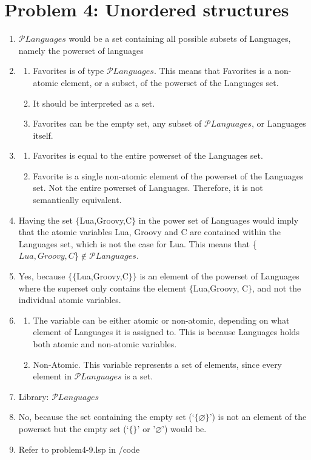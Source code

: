 \documentclass[12pt]{article}
\begin{document}
\section*{Problem 4: Unordered structures}
\begin{enumerate}
	\item $\mathcal{P}Languages$ would be a set containing all possible subsets of Languages, namely the powerset of languages
	\item 
	\begin{enumerate}
		\item Favorites is of type $\mathcal{P}Languages$. This means that Favorites is a non-atomic element, or a subset, of the powerset of the Languages set.
		\item It should be interpreted as a set.
		\item Favorites can be the empty set, any subset of $\mathcal{P}Languages$, or Languages itself.
	\end{enumerate}
	\item
	\begin{enumerate}
		\item Favorites is equal to the entire powerset of the Languages set.
		\item Favorite is a single non-atomic element of the powerset of the Languages set. Not the entire powerset of Languages. Therefore, it is not semantically equivalent.
	\end{enumerate}
	
	\item Having the set $\{$Lua,Groovy,C$\}$ in the power set of Languages would imply that the atomic variables Lua, Groovy and C are contained within the Languages set, which is not the case for Lua.
			This means that $ $\{$Lua,Groovy,C$\}$ \not\in \mathcal{P}Languages$.
	
	\item Yes, because $\{ \{$Lua,Groovy,C$\} \}$ is an element of the powerset of Languages where the superset only contains the element $\{$Lua,Groovy, C$\}$, and not the individual atomic variables.
	\item
	\begin{enumerate}
		\item The variable can be either atomic or non-atomic, depending on what element of Languages it is assigned to. This is because Languages holds both atomic and non-atomic variables.
		\item Non-Atomic. This variable represents a set of elements, since every element in $\mathcal{P}Languages$ is a set.
	\end{enumerate}	
	\item Library: $\mathcal{P}Languages$
	\item No, because the set containing the empty set (‘$\{ \varnothing  \}$’) is not an element of the powerset but the empty set (‘$\{ \}$’ or '$\varnothing$') would be.
	\item Refer to problem4-9.lsp in /code
\end{enumerate}
\end{document}
